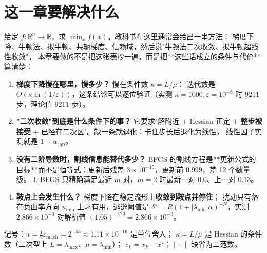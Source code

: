 

\section{这一章要解决什么}

给定 $f:\mathbb{R}^n\to\mathbb{R}$，求 $\min_x f(x)$。教科书在这里通常会给出一串方法：
梯度下降、牛顿法、拟牛顿、共轭梯度、信赖域，然后说"牛顿法二次收敛、拟牛顿超线性收敛"。
本章要做的不是把这张表抄一遍，而是把**这些话成立的条件与代价**算清楚：

\begin{enumerate}
  \item \textbf{梯度下降慢在哪里，慢多少？} 慢在条件数 $\kappa=L/\mu$：
        迭代数是 $\Theta(\kappa\ln(1/\varepsilon))$，这条结论可以逐位验证（实测
        $\kappa=1000,\varepsilon=10^{-8}$ 时 $9211$ 步，理论值 $9211$ 步）。
  \item \textbf{"二次收敛"到底是什么条件下的事？} 它要求"解附近 $+$ Hessian 正定 $+$
        \textbf{整步被接受} $+$ 已经在二次区"。缺一条就退化：卡住步长后退化为线性，
        线性因子实测就是 $1-\alpha_{\text{cap}}$。
  \item \textbf{没有二阶导数时，割线信息能替代多少？} BFGS 的割线方程是**更新公式的
        目标**而不是恒等式：更新后残差 $3\times10^{-15}$，更新前 $0.999$，差 12 个数量级。
        L-BFGS 只精确满足最近 $m$ 对，$m=2$ 时最新一对 $0.0$、上一对 $0.13$。
  \item \textbf{鞍点上会发生什么？} 梯度下降在稳定流形上\textbf{收敛到鞍点并停住}；
        扰动只有落在负曲率方向 $u_{\min}$ 上才有用，逃逸阈值是
        $\delta^\star=R(1+|\lambda_{\min}|\alpha)^{-N}$，实测
        $2.866\times10^{-3}$ 对解析值 $(1.05)^{-120}=2.866\times10^{-3}$。
\end{enumerate}

记号：$u=\tfrac12\varepsilon_{\text{mach}}=2^{-53}\approx1.11\times10^{-16}$ 是单位舍入；
$\kappa=L/\mu$ 是 Hessian 的条件数（二次型上 $L=\lambda_{\max}$、$\mu=\lambda_{\min}$）；
$e_k=x_k-x^\star$；$\|\cdot\|$ 缺省为二范数。

